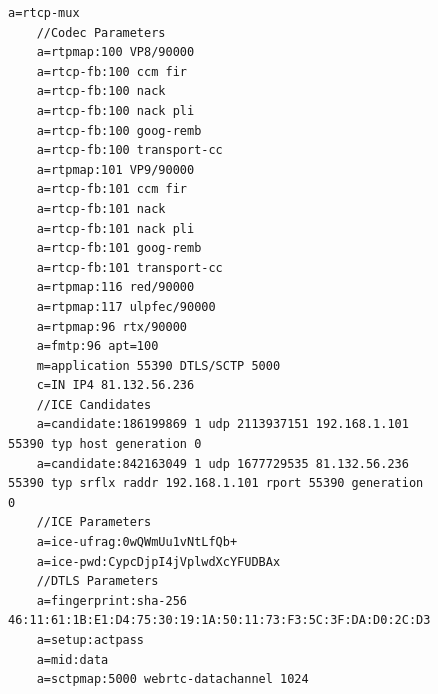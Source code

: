 \documentclass[]{report}
\begin{document}
\begin{figure}[h!]
\begin{lstlisting}[tabsize=1,frame=single, basicstyle=\ttfamily\footnotesize, breaklines=true]
	a=rtcp-mux
	//Codec Parameters
	a=rtpmap:100 VP8/90000
	a=rtcp-fb:100 ccm fir
	a=rtcp-fb:100 nack
	a=rtcp-fb:100 nack pli
	a=rtcp-fb:100 goog-remb
	a=rtcp-fb:100 transport-cc
	a=rtpmap:101 VP9/90000
	a=rtcp-fb:101 ccm fir
	a=rtcp-fb:101 nack
	a=rtcp-fb:101 nack pli
	a=rtcp-fb:101 goog-remb
	a=rtcp-fb:101 transport-cc
	a=rtpmap:116 red/90000
	a=rtpmap:117 ulpfec/90000
	a=rtpmap:96 rtx/90000
	a=fmtp:96 apt=100
	m=application 55390 DTLS/SCTP 5000
	c=IN IP4 81.132.56.236
	//ICE Candidates
	a=candidate:186199869 1 udp 2113937151 192.168.1.101 55390 typ host generation 0
	a=candidate:842163049 1 udp 1677729535 81.132.56.236 55390 typ srflx raddr 192.168.1.101 rport 55390 generation 0
	//ICE Parameters
	a=ice-ufrag:0wQWmUu1vNtLfQb+
	a=ice-pwd:CypcDjpI4jVplwdXcYFUDBAx
	//DTLS Parameters
	a=fingerprint:sha-256 46:11:61:1B:E1:D4:75:30:19:1A:50:11:73:F3:5C:3F:DA:D0:2C:D3:6F:E3:CE:EB:1E:13:94:12:00:71:51:60
	a=setup:actpass
	a=mid:data
	a=sctpmap:5000 webrtc-datachannel 1024
	\end{lstlisting}	
\end{figure}
\end{document}
